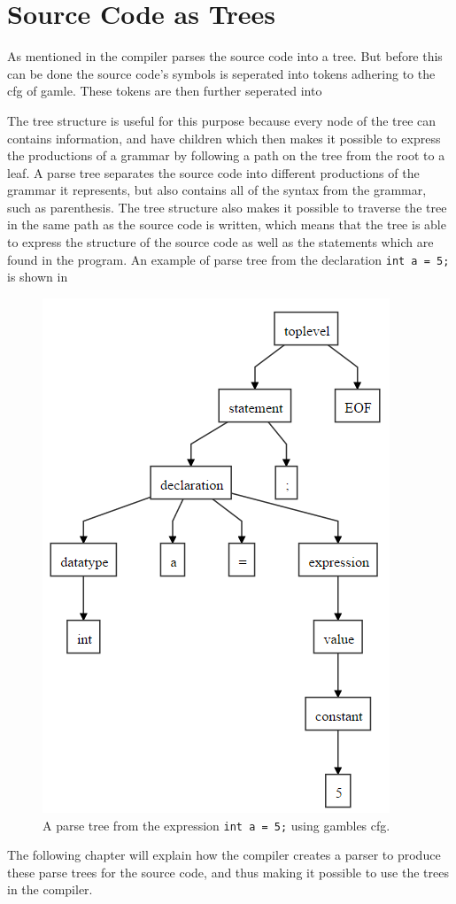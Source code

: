 \section{Source Code as Trees}\label{SourceCodeAsTrees}


As mentioned in  the compiler parses the source code into a tree.
But before this can be done the source code's symbols is seperated into tokens adhering to the \acrshort{cfg} of \gls{gamle}.
These tokens are then further seperated into 

The tree structure is useful for this purpose because every node of the tree can contains information, and have children which then makes it possible to express the productions of a grammar by following a path on the tree from the root to a leaf.
A parse tree separates the source code into different productions of the grammar it represents, but also contains all of the syntax from the grammar, such as parenthesis.
The tree structure also makes it possible to traverse the tree in the same path as the source code is written, which means that the tree is able to express the structure of the source code as well as the statements which are found in the program.
An example of parse tree from the declaration \texttt{int a = 5;} is shown in 

\begin{figure}
    \centering
    \includegraphics[width=0.5\linewidth]{figures/Trees/PST.PNG}
    \caption{A parse tree from the expression \texttt{int a = 5;} using \glspl{gamble} \acrshort{cfg}.}\label{image:PST}
\end{figure}

The following chapter will explain how the compiler creates a parser to produce these parse trees for the source code, and thus making it possible to use the trees in the compiler.
